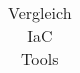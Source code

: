 \begin{table}[H]
{\begin{tabular}{r|c|c|c|c|}
\end{tabular}%
}
\caption{Vergleich IaC Tools}
\label{tab:iac_tools_vergleich}
\end{table}

%
